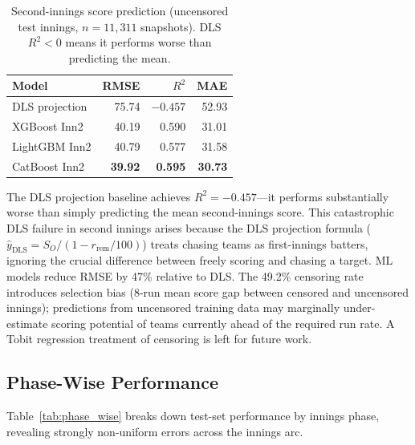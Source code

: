 \documentclass[10pt,a4paper,twocolumn]{article}
\begin{document}
\begin{table}[htbp]
\centering
\caption{Second-innings score prediction (uncensored test innings, $n=11{,}311$ snapshots). DLS $R^2 < 0$ means it performs worse than predicting the mean.}
\label{tab:inn2_results}
\small
\begin{tabular}{lrrr}
\toprule
\textbf{Model} & \textbf{RMSE} & $R^2$ & \textbf{MAE} \\
\midrule
DLS projection     & 75.74 & $-0.457$ & 52.93 \\
\midrule
XGBoost Inn2       & 40.19 & 0.590 & 31.01 \\
LightGBM Inn2      & 40.79 & 0.577 & 31.58 \\
CatBoost Inn2      & \textbf{39.92} & \textbf{0.595} & \textbf{30.73} \\
\bottomrule
\end{tabular}
\end{table}

The DLS projection baseline achieves $R^2 = -0.457$---it performs substantially worse than simply predicting the mean second-innings score. This catastrophic DLS failure in second innings arises because the DLS projection formula ($\hat{y}_\text{DLS} = S_O / (1 - r_\text{rem}/100)$) treats chasing teams as first-innings batters, ignoring the crucial difference between freely scoring and chasing a target. ML models reduce RMSE by 47\% relative to DLS. The 49.2\% censoring rate introduces selection bias (8-run mean score gap between censored and uncensored innings); predictions from uncensored training data may marginally under-estimate scoring potential of teams currently ahead of the required run rate. A Tobit regression treatment of censoring is left for future work.

\subsection{Phase-Wise Performance}
\label{sec:phase}

Table~\ref{tab:phase_wise} breaks down test-set performance by innings phase, revealing strongly non-uniform errors across the innings arc.
\end{document}
